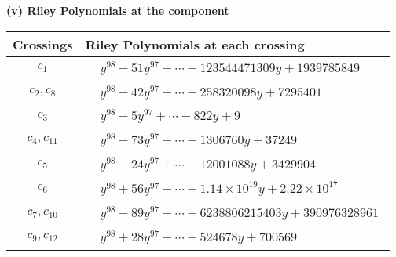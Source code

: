 \documentclass[1p]{elsarticle_modified}
\theoremstyle{definition}
\begin{document}
\newpage\renewcommand{\arraystretch}{1}
\flushleft \textbf{(v) Riley Polynomials at the component}\newline \\
\begin{tabular}{m{50pt}|m{274pt}}
Crossings & \hspace{64pt}Riley Polynomials at each crossing \\
\hline $$\begin{aligned}c_{1}\end{aligned}$$&$\begin{aligned}
&y^{98}-51 y^{97}+\cdots-123544471309 y+1939785849
\end{aligned}$\\
\hline $$\begin{aligned}c_{2},c_{8}\end{aligned}$$&$\begin{aligned}
&y^{98}-42 y^{97}+\cdots-258320098 y+7295401
\end{aligned}$\\
\hline $$\begin{aligned}c_{3}\end{aligned}$$&$\begin{aligned}
&y^{98}-5 y^{97}+\cdots-822 y+9
\end{aligned}$\\
\hline $$\begin{aligned}c_{4},c_{11}\end{aligned}$$&$\begin{aligned}
&y^{98}-73 y^{97}+\cdots-1306760 y+37249
\end{aligned}$\\
\hline $$\begin{aligned}c_{5}\end{aligned}$$&$\begin{aligned}
&y^{98}-24 y^{97}+\cdots-12001088 y+3429904
\end{aligned}$\\
\hline $$\begin{aligned}c_{6}\end{aligned}$$&$\begin{aligned}
&y^{98}+56 y^{97}+\cdots+1.14\times10^{19} y+2.22\times10^{17}
\end{aligned}$\\
\hline $$\begin{aligned}c_{7},c_{10}\end{aligned}$$&$\begin{aligned}
&y^{98}-89 y^{97}+\cdots-6238806215403 y+390976328961
\end{aligned}$\\
\hline $$\begin{aligned}c_{9},c_{12}\end{aligned}$$&$\begin{aligned}
&y^{98}+28 y^{97}+\cdots+524678 y+700569
\end{aligned}$\\
\hline
\end{tabular}\\~\\
\end{document}
